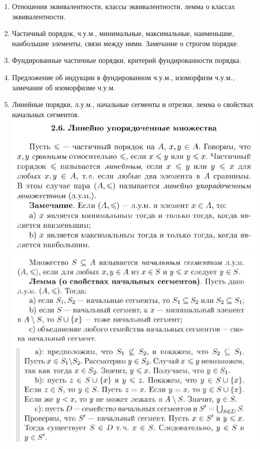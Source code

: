 \documentclass[a4paper]{article}
\theoremstyle{definition}
\begin{document}
\begin{enumerate}
\begin{proof}
       \end{proof}
 \item Отношения эквивалентности, классы эквивалентности, лемма о классах эквивалентности.
 \item Частичный порядок, ч.у.м., минимальные, максимальные, наименьшие, наибольшие элементы,
       связи между ними. Замечание о строгом порядке.
 \item Фундированные частичные порядки, критерий фундированности порядка.
 \item Предложение об индукции в фундированном ч.у.м., изоморфизм ч.у.м., замечание об изоморфизме ч.у.м.
 \item Линейные порядки, л.у.м., начальные сегменты и отрезки, лемма о свойствах начальных сегментов.
       \mbox{}\\ \includegraphics[scale=0.35]{11_1.jpg}\\
       \includegraphics[scale=0.35]{11_2.jpg}\\

\end{enumerate}
\end{document}
